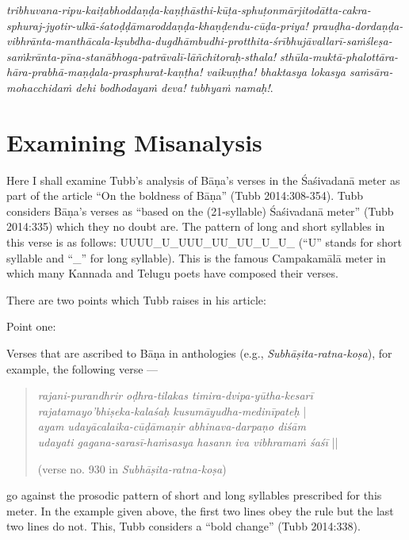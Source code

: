 \begin{enumerate}
{\textsl{tribhuvana-ripu-kaiṭabhoddaṇḍa-kaṇṭhāsthi-kūṭa-sphuṭo\-nmārjitodātta-cakra-sphuraj-jyotir-ulkā-śatoḍḍāmaroddaṇḍa-khaṇḍendu-cūḍa-priya! prauḍha-dordaṇḍa-vibhrānta-manthācala-kṣubdha-dugdhāmbudhi-protthita-śrībhujāvallarī-saṁśleṣa-saṁkrānta-pīna-stanābhoga-patrāvalī-lāñchitoraḥ-sthala! sthūla-muktā-phalottāra-hāra-prabhā-maṇḍala-prasphurat-kaṇṭha! vaikuṇṭha! bhaktasya lokasya saṁsāra-mohacchidaṁ dehi bodhodayaṁ deva! tubhyaṁ namaḥ!}}.
\end{enumerate}

\section*{Examining Misanalysis}

Here I shall examine Tubb’s analysis of Bāṇa’s verses in the Śaśivadanā meter as part of the article “On the boldness of Bāṇa” (Tubb 2014:308-354). Tubb considers Bāṇa’s verses as “based on the (21-syllable) Śaśivadanā meter” (Tubb 2014:335) which they no doubt are. The pattern of long and short syllables in this verse is as follows: UUUU\_U\_UUU\_UU\_UU\_U\_U\_ (“U” stands for short syllable and “\_” for long syllable). This is the famous Campakamālā meter in which many Kannada and Telugu poets have composed their verses.

There are two points which Tubb raises in his article:

Point one: 

Verses that are ascribed to Bāṇa in anthologies (e.g., \textsl{Subhāṣita-ratna-koṣa}), for example, the following verse --- 
\begin{quote}
\textsl{rajani-purandhrir oḍhra-tilakas timira-dvipa-yūtha-kesarī}\\
\qquad \textsl{     rajatamayo’bhiṣeka-kalaśaḥ kusumāyudha-medinīpateḥ} |\\
\textsl{ayam udayācalaika-cūḍāmaṇir abhinava-darpaṇo diśām}\\
\qquad\textsl{udayati gagana-sarasī-haṁsasya hasann iva vibhramaṁ śaśī} ||

\hfill (verse no. 930 in \textsl{Subhāṣita-ratna-koṣa}) 
\end{quote}
go against the prosodic pattern of short and long syllables prescribed for this meter. In the example given above, the first two lines obey the rule but the last two lines do not. This, Tubb considers a “bold change” (Tubb 2014:338). 

